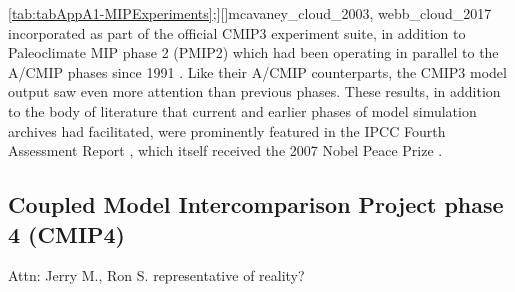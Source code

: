 \documentclass[gmd, preprint]{copernicus}
\newcommand{\mycomment}[1]{}
\def\cred#1{{\color{red}#1}}
\begin{document}
\autoref{tab:tabAppA1-MIPExperiments};][]{mcavaney_cloud_2003, webb_cloud_2017} incorporated as part of the official CMIP3 experiment suite, in addition to Paleoclimate MIP phase 2 (PMIP2) which had been operating in parallel to the A/CMIP phases since 1991 \citep{villwock_6th_2003, braconnot_paleoclimate_2011}. Like their A/CMIP counterparts, the CMIP3 model output saw even more attention than previous phases. These results, in addition to the body of literature that current and earlier phases of model simulation archives had facilitated, were prominently featured in the IPCC Fourth Assessment Report \citep[AR4;][]{randall_climate_2007}, which itself received the 2007 Nobel Peace Prize \citep{kerr_nobel_2007}.

\mycomment{
CLIVAR MIPs list circa 2005 - lots ~30
http://web.archive.org/web/20050319232556/http://www.clivar.org/science/mips.htm
This omits the CMIP Coordinated Experiment focus which were all announced in 2002 - https://web.archive.org/web/20040827091054/http://www-pcmdi.llnl.gov/cmip/ - subsequently known as CMIP3
Also https://pcmdi.llnl.gov/mips/cmip/ann_20c3m.html
Also PCMDI provided disks to modelling groups who copied data and posted them back - Meehl et al., 2003
Meehl & Hibbard, 2007: A STRATEGY FOR CLIMATE CHANGE STABILIZATION EXPERIMENTS WITH AOGCMs AND ESMs https://www.agci.org/wp-content/uploads/imported-files/2022/07/06S1_WhitePaper.pdf
C4MIP ~2002 https://web.archive.org/web/20040804013119/http://www.c4mip.cnrs-gif.fr/protocol.html
}


\subsection{Coupled Model Intercomparison Project phase 4 (CMIP4)}
\cred{Attn: Jerry M., Ron S. representative of reality?}
\end{document}
